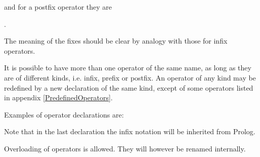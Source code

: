 {\noindent
and for a postfix operator they are\bigskip

 .\bigskip

The meaning of the fixes should be clear by analogy with those for infix operators.
%
%
%
%

It is possible to have more than one operator of the same name, as long as they are
of different kinds, i.e. infix, prefix or postfix. An operator of any kind may be
redefined by a new declaration of the same kind, except of some operators
listed in appendix \ref{PredefinedOperators}.

\noindent Examples of operator declarations are: \bigskip

\bigskip

\hfill \bigskip

\bigskip 

\bigskip

\noindent 
Note that in the last declaration the infix notation
 will be inherited from Prolog. 

Overloading of operators is allowed. They will however be renamed internally.

}
